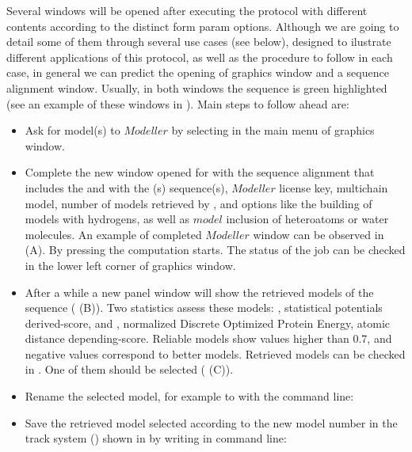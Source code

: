 \begin{itemize}
  Several \chimera windows will be opened after executing the protocol with different contents according to the distinct form param options. Although we are going to detail some of them through several use cases (see below), designed to ilustrate different applications of this protocol, as well as the procedure to follow in each case, in general we can predict the opening of \chimera graphics window and a sequence alignment window. Usually, in both windows the  sequence is green highlighted (see an example of these windows in ). Main steps to follow ahead are:
            \begin{itemize}
            \item Ask for model(s) to $Modeller$ by selecting  in the main menu of \chimera graphics window. 
            \item Complete the new window opened for  with the sequence alignment that includes the  and with the (s) sequence(s), $Modeller$ license key, multichain model, number of models retrieved by \modeller, and  options like the building of models with hydrogens, as well as $model$ inclusion of heteroatoms or water molecules. An example of completed $Modeller$ window can be observed in  (A). By pressing  the computation starts. The status of the job can be checked in the lower left corner of \chimera graphics window.
            \item After a while a new panel window will show the retrieved models of the  sequence ( (B)). Two statistics assess these models: , statistical potentials derived-score, and , normalized Discrete Optimized Protein Energy, atomic distance depending-score. Reliable models show  values higher than 0.7, and negative  values correspond to better models.  Retrieved models can be checked in \chimera {}. One of them should be selected ( (C)).
            \item Rename the selected model, for example  to  with the command line:\\ 
            \item Save the retrieved model selected according to the new model number in the \scipion track system () shown in \chimera {} by writing in \chimera command line:\\
            \end{itemize}
  

\end{itemize}
